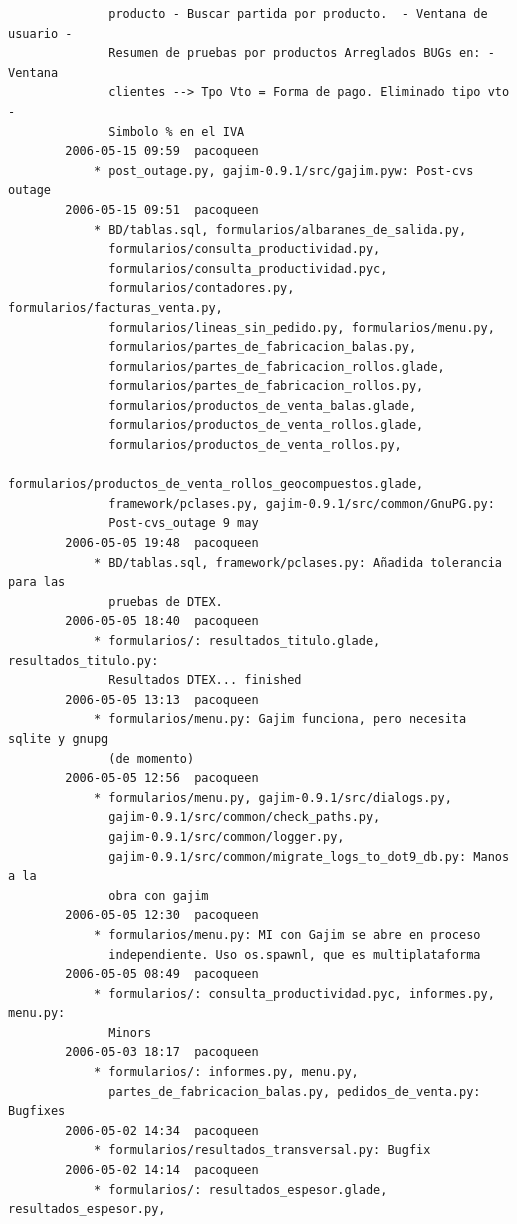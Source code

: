 \documentclass[a4paper]{article}
\begin{document}
\begin{verbatim}
              producto - Buscar partida por producto.  - Ventana de usuario -
              Resumen de pruebas por productos Arreglados BUGs en: - Ventana
              clientes --> Tpo Vto = Forma de pago. Eliminado tipo vto -
              Simbolo % en el IVA
        2006-05-15 09:59  pacoqueen
            * post_outage.py, gajim-0.9.1/src/gajim.pyw: Post-cvs outage
        2006-05-15 09:51  pacoqueen
            * BD/tablas.sql, formularios/albaranes_de_salida.py,
              formularios/consulta_productividad.py,
              formularios/consulta_productividad.pyc,
              formularios/contadores.py, formularios/facturas_venta.py,
              formularios/lineas_sin_pedido.py, formularios/menu.py,
              formularios/partes_de_fabricacion_balas.py,
              formularios/partes_de_fabricacion_rollos.glade,
              formularios/partes_de_fabricacion_rollos.py,
              formularios/productos_de_venta_balas.glade,
              formularios/productos_de_venta_rollos.glade,
              formularios/productos_de_venta_rollos.py,
              formularios/productos_de_venta_rollos_geocompuestos.glade,
              framework/pclases.py, gajim-0.9.1/src/common/GnuPG.py:
              Post-cvs_outage 9 may
        2006-05-05 19:48  pacoqueen
            * BD/tablas.sql, framework/pclases.py: Añadida tolerancia para las
              pruebas de DTEX.
        2006-05-05 18:40  pacoqueen
            * formularios/: resultados_titulo.glade, resultados_titulo.py:
              Resultados DTEX... finished
        2006-05-05 13:13  pacoqueen
            * formularios/menu.py: Gajim funciona, pero necesita sqlite y gnupg
              (de momento)
        2006-05-05 12:56  pacoqueen
            * formularios/menu.py, gajim-0.9.1/src/dialogs.py,
              gajim-0.9.1/src/common/check_paths.py,
              gajim-0.9.1/src/common/logger.py,
              gajim-0.9.1/src/common/migrate_logs_to_dot9_db.py: Manos a la
              obra con gajim
        2006-05-05 12:30  pacoqueen
            * formularios/menu.py: MI con Gajim se abre en proceso
              independiente. Uso os.spawnl, que es multiplataforma
        2006-05-05 08:49  pacoqueen
            * formularios/: consulta_productividad.pyc, informes.py, menu.py:
              Minors
        2006-05-03 18:17  pacoqueen
            * formularios/: informes.py, menu.py,
              partes_de_fabricacion_balas.py, pedidos_de_venta.py: Bugfixes
        2006-05-02 14:34  pacoqueen
            * formularios/resultados_transversal.py: Bugfix
        2006-05-02 14:14  pacoqueen
            * formularios/: resultados_espesor.glade, resultados_espesor.py,

\end{verbatim}
\end{document}
